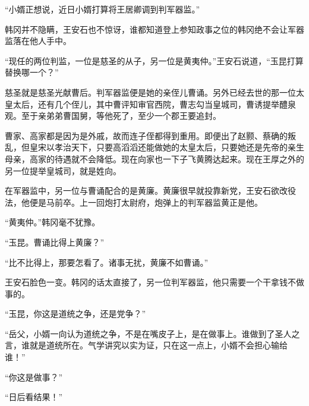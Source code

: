 “小婿正想说，近日小婿打算将王居卿调到判军器监。”

韩冈并不隐瞒，王安石也不惊讶，谁都知道登上参知政事之位的韩冈绝不会让军器监落在他人手中。

“现任的两位判监，一位是慈圣的从子，另一位是黄夷仲。”王安石说道，“玉昆打算替换哪一个？”

慈圣就是慈圣光献曹后。判军器监便是她的亲侄儿曹诵。另外已经去世的那一位太皇太后，还有几个侄儿，其中曹评知审官西院，曹志勾当皇城司，曹诱提举醴泉观。至于亲弟弟曹国舅，等他死了，至少一个郡王要追封。

曹家、高家都是因为是外戚，故而连子侄都得到重用。即便出了赵颢、蔡确的叛乱，但皇宋以孝治天下，只要高滔滔还能做她的太皇太后，只要她还是先帝的亲生母亲，高家的待遇就不会降低。现在向家也一下子飞黄腾达起来。现在王厚之外的另一位提举皇城司，就是姓向。

在军器监中，另一位与曹诵配合的是黄廉。黄廉很早就投靠新党，王安石欲改役法，他便是马前卒。上一回炮打太尉府，炮弹上的判军器监黄正是他。

“黄夷仲。”韩冈毫不犹豫。

“玉昆。曹诵比得上黄廉？”

“比不比得上，那要怎看了。诸事无扰，黄廉不如曹诵。”

王安石脸色一变。韩冈的话太直接了，另一位判军器监，他只需要一个干拿钱不做事的。

“玉昆，你这是道统之争，还是党争？”

“岳父，小婿一向认为道统之争，不是在嘴皮子上，是在做事上。谁做到了圣人之言，谁就是道统所在。气学讲究以实为证，只在这一点上，小婿不会担心输给谁！”

“你这是做事？”

“日后看结果！”
